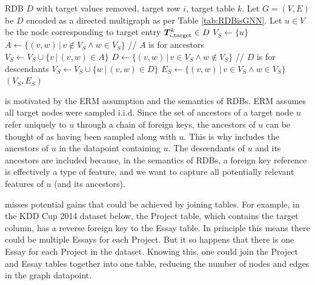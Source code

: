\documentclass{article}
\begin{document}
\begin{algorithm}[h!]
\caption{: Produce a graph of related entries in an RDB $D$ useful for classifying a target entry in $D$.  Runs in $O(|V| + |E|)$ time.}
\label{alg:rdbtograph}
\begin{algorithmic}
\Require RDB $D$ with target values removed, target row $i$, target table $k$. 
\label{func:rdbtograph}
\State Let $G = (V, E)$ be $D$ encoded as a directed multigraph as per Table \ref{tab:RDBisGNN}.
\State Let $u \in V$ be the node corresponding to target entry ${\bm{T}}^k_{i, \text{target}} \in D$
\State $V_S \gets \{ u \}$ 
\Repeat
    \State $A \gets \{ (v,w) \hspace{2pt} \vert \hspace{2pt} v \notin V_S \land w \in V_S \}$  // $A$ is for ancestors
    \State $V_S \gets V_S \cup \{ v \hspace{2pt} \vert \hspace{2pt} (v,w) \in A \} $
\Repeat
    \State $D \gets \{ (v,w) \hspace{2pt} \vert \hspace{2pt} v \in V_S \land w \notin V_S   \}$  // $D$ is for descendants
    \State $V_S \gets V_S \cup \{ w \hspace{2pt} \vert \hspace{2pt} (v,w) \in D \} $
\State $E_S \gets \{ (v,w) \hspace{2pt} \vert \hspace{2pt} v \in V_S \land w \in V_S \}$
\State \Return $(V_S, E_S)$
\EndFunction
\end{algorithmic}
\end{algorithm}


 is motivated by the ERM assumption and the semantics of RDBs.  ERM assumes all target nodes were sampled i.i.d.  Since the set of ancestors of a target node $u$ refer uniquely to $u$ through a chain of foreign keys, the ancestors of $u$ can be thought of as having been sampled along with $u$.  This is why  includes the ancestors of $u$ in the datapoint containing $u$.  The descendants of $u$ and its ancestors are included because, in the semantics of RDBs, a foreign key reference is effectively a type of feature, and we want to capture all potentially relevant features of $u$ (and its ancestors).

 misses potential gains that could be achieved by joining tables.  For example, in the KDD Cup 2014 dataset below, the Project table, which contains the target column, has a reverse foreign key to the Essay table.  In principle this means there could be multiple Essays for each Project.  But it so happens that there is one Essay for each Project in the dataset.  Knowing this, one could join the Project and Essay tables together into one table, reducing the number of nodes and edges in the graph datapoint.
\end{document}
